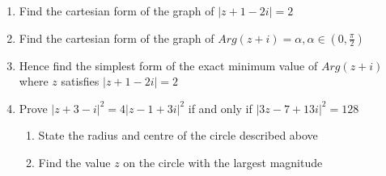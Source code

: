 \documentclass[12pt]{article}
\begin{document}
\begin{enumerate}
    \item Find the cartesian form of the graph of $|  z + 1 - 2i | = 2$
    \vspace{2cm}
    \item Find the cartesian form of the graph of $Arg(z + i) = \alpha , \alpha \in (0,\frac{\pi}{2})$
    \vspace{2cm}
    \item Hence find the simplest form of the exact minimum value of $Arg(z + i)$ where $z$ satisfies $|  z + 1 - 2i | = 2$
    \vspace{2cm}
    \item Prove $|z + 3 - i|^2 = 4|z - 1 + 3i|^2$ if and only if $|3z - 7 + 13i|^2 = 128$
    \vspace{2cm}
    \begin{enumerate}
        \item State the radius and centre of the circle described above
        \vspace{2cm}
        \item Find the value $z$ on the circle with the largest magnitude
    \end{enumerate}

\end{enumerate}
\end{document}
